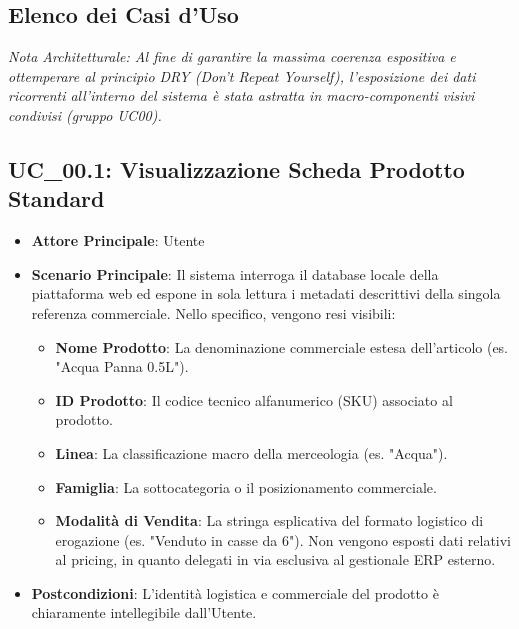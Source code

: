 \subsection{Elenco dei Casi d'Uso}

\textit{Nota Architetturale: Al fine di garantire la massima coerenza espositiva e ottemperare al principio DRY (Don't Repeat Yourself), l'esposizione dei dati ricorrenti all'interno del sistema è stata astratta in macro-componenti visivi condivisi (gruppo UC00).}

\subsection{UC\_00.1: Visualizzazione Scheda Prodotto Standard}
\label{uc_00.1}
\begin{itemize}
    \item \textbf{Attore Principale}: Utente
    \item \textbf{Scenario Principale}: Il sistema interroga il database locale della piattaforma web ed espone in sola lettura i metadati descrittivi della singola referenza commerciale. Nello specifico, vengono resi visibili:
    \begin{itemize}
        \item \textbf{Nome Prodotto}: La denominazione commerciale estesa dell'articolo (es. "Acqua Panna 0.5L").
        \item \textbf{ID Prodotto}: Il codice tecnico alfanumerico (SKU) associato al prodotto.
        \item \textbf{Linea}: La classificazione macro della merceologia (es. "Acqua").
        \item \textbf{Famiglia}: La sottocategoria o il posizionamento commerciale.
        \item \textbf{Modalità di Vendita}: La stringa esplicativa del formato logistico di erogazione (es. "Venduto in casse da 6"). Non vengono esposti dati relativi al pricing, in quanto delegati in via esclusiva al gestionale ERP esterno.
    \end{itemize}
    \item \textbf{Postcondizioni}: L'identità logistica e commerciale del prodotto è chiaramente intellegibile dall'Utente.
\end{itemize}

